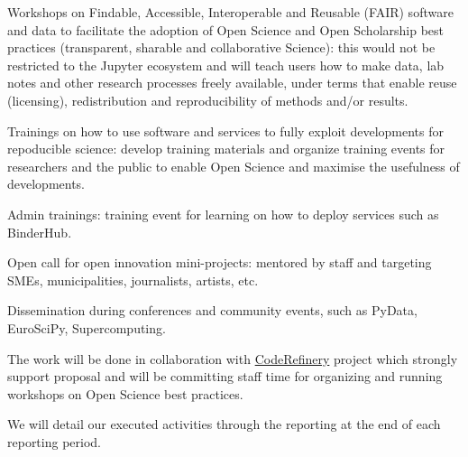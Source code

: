 \begin{task}[
  title=Training Workshops for more reproducible science,
  id=workshops,
  lead=UIO,
  PM=10,
  wphases={12-36!.416},
  partners={SRL,MP,IFR}
]
\begin{compactitem}
   \item Workshops on Findable, Accessible, Interoperable and Reusable (FAIR)
     software and data to facilitate the adoption of Open Science and Open
     Scholarship best practices (transparent, sharable and collaborative
     Science): this would not be restricted to the Jupyter ecosystem and will
     teach users how to make data, lab notes and other research processes freely
     available, under terms that enable reuse (licensing), redistribution and
     reproducibility of methods and/or results.

   \item Trainings on how to use \TheProject software and services to fully
     exploit \TheProject developments for repoducible science: develop training
     materials and organize training events for researchers and the public to
     enable Open Science and maximise the usefulness of \TheProject
     developments.

   \item \TheProject Admin trainings: training event for learning on how to
     deploy \TheProject services such as BinderHub.

   \item Open call for open innovation mini-projects: mentored by \TheProject
     staff and targeting SMEs, municipalities, journalists, artists, etc.

   \item Dissemination during conferences and community events, such as PyData,
     EuroSciPy, Supercomputing.

  \end{compactitem}
  The work will be done in collaboration with
  \href{https://coderefinery.org}{CodeRefinery} project which strongly support
  \TheProject proposal and will be committing staff time for organizing and
  running workshops on Open Science best practices. 

  We will detail our executed activities through the reporting at
  the end of each reporting period.
\end{task}
